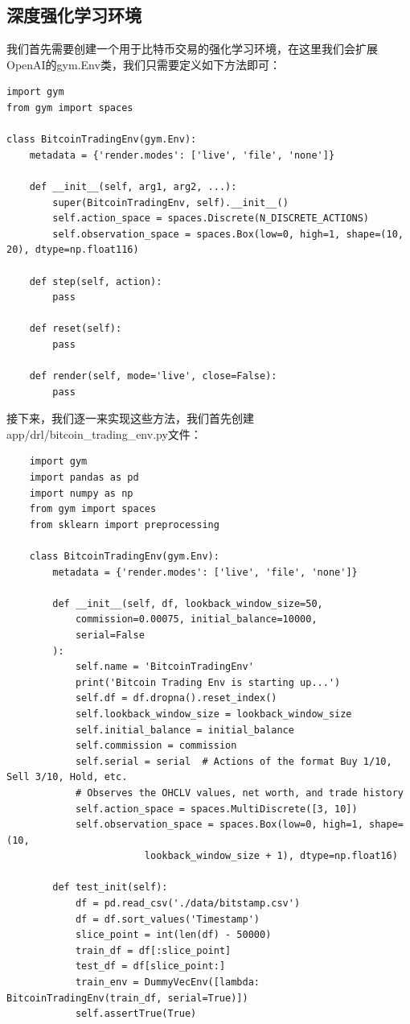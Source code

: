\documentclass{article}
\begin{document}
\subsection{深度强化学习环境}
我们首先需要创建一个用于比特币交易的强化学习环境，在这里我们会扩展OpenAI的gym.Env类，我们只需要定义如下方法即可：
\begin{lstlisting}
import gym
from gym import spaces

class BitcoinTradingEnv(gym.Env):
    metadata = {'render.modes': ['live', 'file', 'none']}

    def __init__(self, arg1, arg2, ...):
        super(BitcoinTradingEnv, self).__init__()
        self.action_space = spaces.Discrete(N_DISCRETE_ACTIONS)
        self.observation_space = spaces.Box(low=0, high=1, shape=(10, 20), dtype=np.float116)

    def step(self, action):
        pass

    def reset(self):
        pass

    def render(self, mode='live', close=False):
        pass
\end{lstlisting} 
接下来，我们逐一来实现这些方法，我们首先创建app/drl/bitcoin\_trading\_env.py文件：
\begin{lstlisting}
    import gym
    import pandas as pd
    import numpy as np
    from gym import spaces
    from sklearn import preprocessing
    
    class BitcoinTradingEnv(gym.Env):
        metadata = {'render.modes': ['live', 'file', 'none']}
    
        def __init__(self, df, lookback_window_size=50,
            commission=0.00075, initial_balance=10000,
            serial=False
        ):
            self.name = 'BitcoinTradingEnv'
            print('Bitcoin Trading Env is starting up...')
            self.df = df.dropna().reset_index()
            self.lookback_window_size = lookback_window_size
            self.initial_balance = initial_balance
            self.commission = commission
            self.serial = serial  # Actions of the format Buy 1/10, Sell 3/10, Hold, etc.
            # Observes the OHCLV values, net worth, and trade history
            self.action_space = spaces.MultiDiscrete([3, 10])
            self.observation_space = spaces.Box(low=0, high=1, shape=(10, 
                        lookback_window_size + 1), dtype=np.float16)

        def test_init(self):
            df = pd.read_csv('./data/bitstamp.csv')
            df = df.sort_values('Timestamp')
            slice_point = int(len(df) - 50000)
            train_df = df[:slice_point]
            test_df = df[slice_point:]
            train_env = DummyVecEnv([lambda: BitcoinTradingEnv(train_df, serial=True)])
            self.assertTrue(True)
\end{lstlisting}
\end{document}
